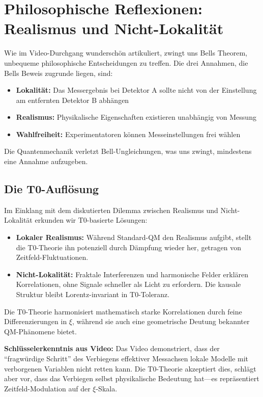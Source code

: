 \section{Philosophische Reflexionen: Realismus und Nicht-Lokalität}
\label{sec:philosophy}

Wie im Video-Durchgang\cite{youtube_bell2025} wunderschön artikuliert, zwingt uns Bells Theorem, unbequeme philosophische Entscheidungen zu treffen. Die drei Annahmen, die Bells Beweis zugrunde liegen, sind:
\begin{itemize}
\item \textbf{Lokalität:} Das Messergebnis bei Detektor A sollte nicht von der Einstellung am entfernten Detektor B abhängen
\item \textbf{Realismus:} Physikalische Eigenschaften existieren unabhängig von Messung
\item \textbf{Wahlfreiheit:} Experimentatoren können Messeinstellungen frei wählen
\end{itemize}

Die Quantenmechanik verletzt Bell-Ungleichungen, was uns zwingt, mindestens eine Annahme aufzugeben.

\subsection{Die T0-Auflösung}

Im Einklang mit dem diskutierten Dilemma zwischen Realismus und Nicht-Lokalität erkunden wir T0-basierte Lösungen:

\begin{itemize}
\item \textbf{Lokaler Realismus:} Während Standard-QM den Realismus aufgibt, stellt die T0-Theorie ihn potenziell durch Dämpfung wieder her, getragen von Zeitfeld-Fluktuationen.
\item \textbf{Nicht-Lokalität:} Fraktale Interferenzen und harmonische Felder erklären Korrelationen, ohne Signale schneller als Licht zu erfordern. Die kausale Struktur bleibt Lorentz-invariant in T0-Toleranz.
\end{itemize}

Die T0-Theorie harmonisiert mathematisch starke Korrelationen durch feine Differenzierungen in $\xi$, während sie auch eine geometrische Deutung bekannter QM-Phänomene bietet.

\textbf{Schlüsselerkenntnis aus Video:} Das Video demonstriert, dass der ``fragwürdige Schritt'' des Verbiegens effektiver Messachsen lokale Modelle mit verborgenen Variablen nicht retten kann. Die T0-Theorie akzeptiert dies, schlägt aber vor, dass das Verbiegen selbst physikalische Bedeutung hat—es repräsentiert Zeitfeld-Modulation auf der $\xi$-Skala.


